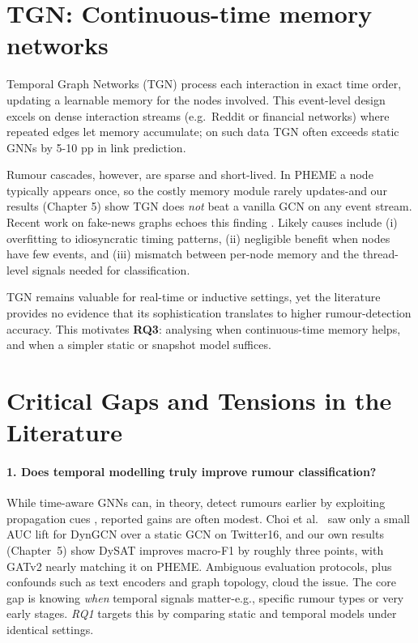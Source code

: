 \documentclass{cshonours}
\begin{document}
\section*{TGN: Continuous-time memory networks}

Temporal Graph Networks (TGN) \cite{rossi2020tgn} process each interaction in exact time order, updating a learnable memory for the nodes involved. This event-level design excels on dense interaction streams (e.g.\ Reddit or financial networks) where repeated edges let memory accumulate; on such data TGN often exceeds static GNNs by 5-10 pp in link prediction.  

Rumour cascades, however, are sparse and short-lived. In PHEME a node typically appears once, so the costly memory module rarely updates-and our results (Chapter 5) show TGN does \emph{not} beat a vanilla GCN on any event stream. Recent work on fake-news graphs echoes this finding \cite{zhang2022dynamic}. Likely causes include (i) overfitting to idiosyncratic timing patterns, (ii) negligible benefit when nodes have few events, and (iii) mismatch between per-node memory and the thread-level signals needed for classification.  

TGN remains valuable for real-time or inductive settings, yet the literature provides no evidence that its sophistication translates to higher rumour-detection accuracy. This motivates \textbf{RQ3}: analysing when continuous-time memory helps, and when a simpler static or snapshot model suffices.




\section{Critical Gaps and Tensions in the Literature}

\paragraph{1. Does temporal modelling truly improve rumour classification?}
While time-aware GNNs can, in theory, detect rumours earlier by exploiting propagation cues \cite{sankar2020dysat, liu2024rumor}, reported gains are often modest. Choi et al.~\cite{choi2021dynGCN} saw only a small AUC lift for DynGCN over a static GCN on Twitter16, and our own results (Chapter~5) show DySAT improves macro-F1 by roughly three points, with GATv2 nearly matching it on PHEME. Ambiguous evaluation protocols, plus confounds such as text encoders and graph topology, cloud the issue. The core gap is knowing \emph{when} temporal signals matter-e.g., specific rumour types or very early stages. \emph{RQ1} targets this by comparing static and temporal models under identical settings.
\end{document}

